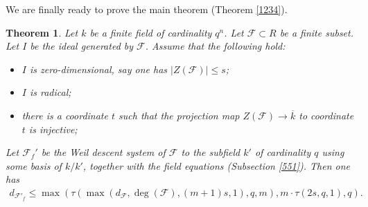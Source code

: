 \documentclass{amsart}
\theoremstyle{plain}
\newtheorem{theorem}{Theorem}[section]
\theoremstyle{definition}
\begin{document}
We are finally ready to prove the main theorem (Theorem \ref{1234}).

\begin{theorem} \label{1235}
Let $k$ be a finite field of cardinality $q^n$. Let $\mathcal{F} \subset R$ be a finite subset. Let $I$ be the ideal generated by $\mathcal{F}$. Assume that the following hold:
\begin{itemize}
\item $I$ is zero-dimensional, say one has $|Z(\mathcal{F})| \leq s$;
\item $I$ is radical;
\item there is a coordinate $t$ such that the projection map $Z(\mathcal{F}) \to \overline{k}$ to coordinate $t$ is injective;
\end{itemize}
Let $\mathcal{F}_f'$ be the Weil descent system of $\mathcal{F}$ to the subfield $k'$ of cardinality $q$ using some basis of $k/k'$, together with the field equations (Subsection \ref{551}). Then one has
\begin{eqnarray*}
d_{\mathcal{F}'_f} \leq \max\left(\tau(\max(d_{\mathcal{F}}, \deg(\mathcal{F}), (m+1)s,1),q,m),m \cdot \tau(2s,q,1), q \right).
\end{eqnarray*}
\end{theorem}
\end{document}
